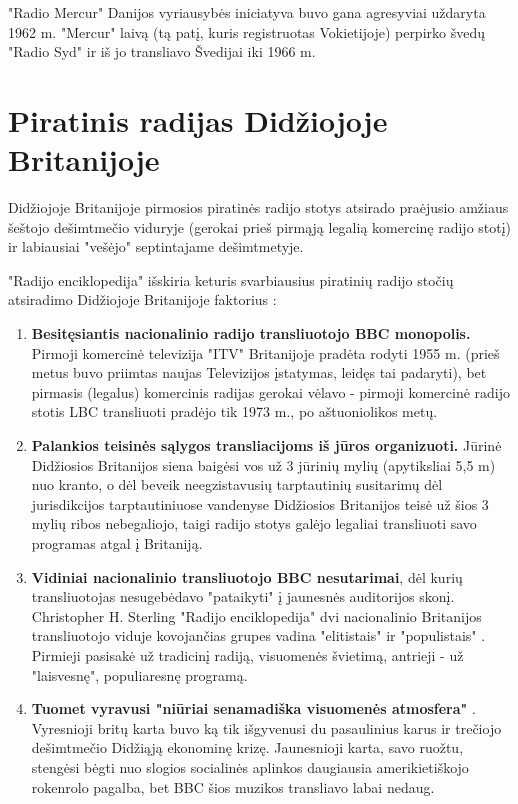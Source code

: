 \documentclass[kursinis-darbas]{vukf}
\begin{document}
"Radio Mercur" Danijos vyriausybės iniciatyva buvo gana agresyviai uždaryta 1962 m. \cite[p.~447]{js_continuum_encyclopedia} "Mercur" laivą (tą patį, kuris registruotas Vokietijoje) perpirko švedų "Radio Syd" ir iš jo transliavo Švedijai iki 1966 m.


\section{Piratinis radijas Didžiojoje Britanijoje}

Didžiojoje Britanijoje pirmosios piratinės radijo stotys atsirado praėjusio amžiaus šeštojo dešimtmečio viduryje (gerokai prieš pirmąją legalią komercinę radijo stotį) ir labiausiai "vešėjo" septintajame dešimtmetyje.

"Radijo enciklopedija" išskiria keturis svarbiausius piratinių radijo stočių atsiradimo Didžiojoje Britanijoje faktorius \cite[p.~237]{chs_encyclopedia_of_radio}:

\begin{enumerate}
	\item \textbf{Besitęsiantis nacionalinio radijo transliuotojo \gls{BBC} monopolis.} Pirmoji komercinė televizija "ITV" Britanijoje pradėta rodyti 1955 m. \cite{itv_first_commercial_tv_in_britain} (prieš metus buvo priimtas naujas Televizijos įstatymas, leidęs tai padaryti), bet pirmasis (legalus) komercinis radijas gerokai vėlavo - pirmoji komercinė radijo stotis LBC transliuoti pradėjo tik 1973 m., po aštuoniolikos metų.
	\item \textbf{Palankios teisinės sąlygos transliacijoms iš jūros organizuoti.} Jūrinė Didžiosios Britanijos siena baigėsi vos už 3 jūrinių mylių (apytiksliai 5,5 m) nuo kranto, o dėl beveik neegzistavusių tarptautinių susitarimų dėl jurisdikcijos tarptautiniuose vandenyse Didžiosios Britanijos teisė už šios 3 mylių ribos nebegaliojo, taigi radijo stotys galėjo legaliai transliuoti savo programas atgal į Britaniją.
	\item \textbf{Vidiniai nacionalinio transliuotojo \gls{BBC} nesutarimai}, dėl kurių transliuotojas nesugebėdavo "pataikyti" į jaunesnės auditorijos skonį. Christopher H. Sterling "Radijo enciklopedija" dvi nacionalinio Britanijos transliuotojo viduje kovojančias grupes vadina "elitistais" ir "populistais" \cite[p.~237]{chs_encyclopedia_of_radio}. Pirmieji pasisakė už tradicinį radiją, visuomenės švietimą, antrieji - už "laisvesnę", populiaresnę programą.
	\item \textbf{Tuomet vyravusi "niūriai senamadiška visuomenės atmosfera"} \cite[p.~237]{chs_encyclopedia_of_radio}. Vyresnioji britų karta buvo ką tik išgyvenusi du pasaulinius karus ir trečiojo dešimtmečio Didžiąją ekonominę krizę. Jaunesnioji karta, savo ruožtu, stengėsi bėgti nuo slogios socialinės aplinkos daugiausia amerikietiškojo rokenrolo pagalba, bet \gls{BBC} šios muzikos transliavo labai nedaug.
\end{enumerate}
\end{document}
